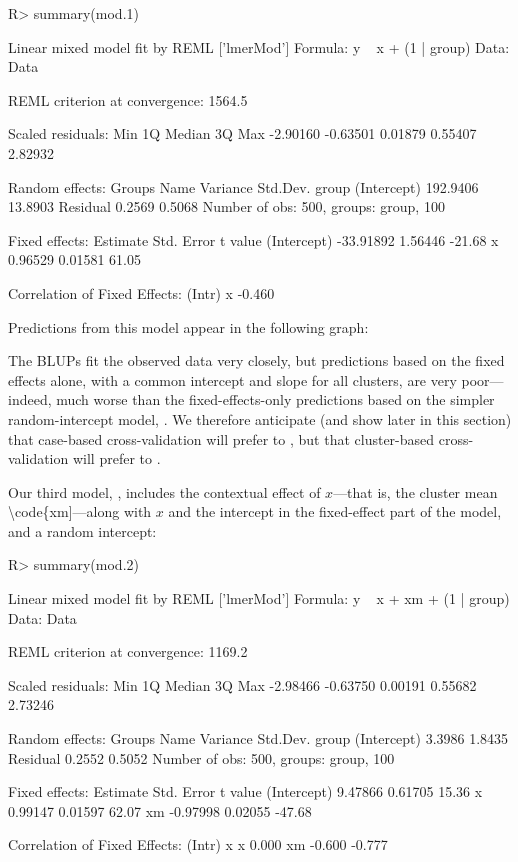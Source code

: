 \documentclass[
]{jss}
\begin{document}
\begin{CodeChunk}
\begin{CodeInput}
R> summary(mod.1)
\end{CodeInput}
\begin{CodeOutput}
Linear mixed model fit by REML ['lmerMod']
Formula: y ~ x + (1 | group)
   Data: Data

REML criterion at convergence: 1564.5

Scaled residuals: 
     Min       1Q   Median       3Q      Max 
-2.90160 -0.63501  0.01879  0.55407  2.82932 

Random effects:
 Groups   Name        Variance Std.Dev.
 group    (Intercept) 192.9406 13.8903 
 Residual               0.2569  0.5068 
Number of obs: 500, groups:  group, 100

Fixed effects:
             Estimate Std. Error t value
(Intercept) -33.91892    1.56446  -21.68
x             0.96529    0.01581   61.05

Correlation of Fixed Effects:
  (Intr)
x -0.460
\end{CodeOutput}
\end{CodeChunk}

Predictions from this model appear in the following graph:

The BLUPs fit the observed data very closely, but predictions based on
the fixed effects alone, with a common intercept and slope for all
clusters, are very poor---indeed, much worse than the fixed-effects-only
predictions based on the simpler random-intercept model, .
We therefore anticipate (and show later in this section) that case-based
cross-validation will prefer  to , but that
cluster-based cross-validation will prefer  to .

Our third model, , includes the contextual effect of
\(x\)---that is, the cluster mean \textbackslash code\{xm{]}---along
with \(x\) and the intercept in the fixed-effect part of the model, and
a random intercept:

\begin{CodeChunk}
\begin{CodeInput}
R> summary(mod.2)
\end{CodeInput}
\begin{CodeOutput}
Linear mixed model fit by REML ['lmerMod']
Formula: y ~ x + xm + (1 | group)
   Data: Data

REML criterion at convergence: 1169.2

Scaled residuals: 
     Min       1Q   Median       3Q      Max 
-2.98466 -0.63750  0.00191  0.55682  2.73246 

Random effects:
 Groups   Name        Variance Std.Dev.
 group    (Intercept) 3.3986   1.8435  
 Residual             0.2552   0.5052  
Number of obs: 500, groups:  group, 100

Fixed effects:
            Estimate Std. Error t value
(Intercept)  9.47866    0.61705   15.36
x            0.99147    0.01597   62.07
xm          -0.97998    0.02055  -47.68

Correlation of Fixed Effects:
   (Intr) x     
x   0.000       
xm -0.600 -0.777
\end{CodeOutput}
\end{CodeChunk}
\end{document}
